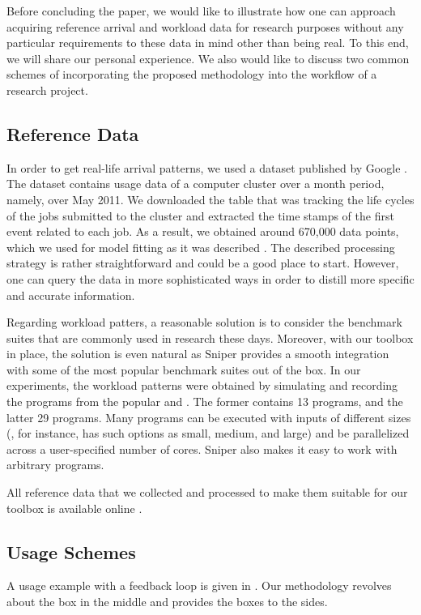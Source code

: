 Before concluding the paper, we would like to illustrate how one can approach
acquiring reference arrival and workload data for research purposes without any
particular requirements to these data in mind other than being real. To this
end, we will share our personal experience. We also would like to discuss two
common schemes of incorporating the proposed methodology into the workflow of a
research project.

\subsection{Reference Data}

In order to get real-life arrival patterns, we used a dataset published by
Google \cite{google}. The dataset contains usage data of a computer cluster over
a month period, namely, over May 2011. We downloaded the table that was tracking
the life cycles of the jobs submitted to the cluster and extracted the time
stamps of the first event related to each job. As a result, we obtained around
670,000 data points, which we used for model fitting as it was described
. The described processing strategy is rather straightforward and
could be a good place to start. However, one can query the data in more
sophisticated ways in order to distill more specific and accurate information.

Regarding workload patters, a reasonable solution is to consider the benchmark
suites that are commonly used in research these days. Moreover, with our toolbox
in place, the solution is even natural as Sniper provides a smooth integration
with some of the most popular benchmark suites out of the box. In our
experiments, the workload patterns were obtained by simulating and recording the
programs from the popular  \cite{bienia2011} and 
\cite{cpu2006}. The former contains 13 programs, and the latter 29 programs.
Many programs can be executed with inputs of different sizes (, for
instance, has such options as small, medium, and large) and be parallelized
across a user-specified number of cores. Sniper also makes it easy to work with
arbitrary programs.

All reference data that we collected and processed to make them suitable for our
toolbox is available online \cite{sources}.

\subsection{Usage Schemes}

A usage example with a feedback loop is given in . Our methodology
revolves about the box in the middle and provides the boxes to the sides.
